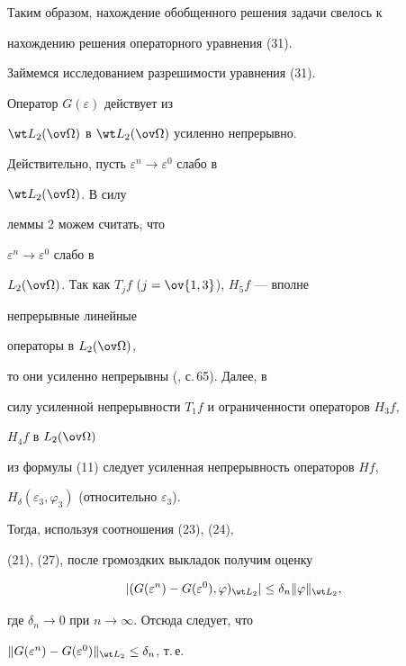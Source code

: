 Таким образом, нахождение обобщенного решения задачи свелось к 


нахождению решения операторного уравнения (31). 





Займемся исследованием разрешимости уравнения (31).


 


\begin{thm} 


Оператор $G(\varepsilon)$ действует из 


$\wt L_2(\ov\Omega)$ в $\wt L_2(\ov\Omega)$ усиленно непрерывно. 


\end{thm} 


 


Действительно, пусть $\varepsilon^n\to\varepsilon^0$ слабо в 


$\wt L_2(\ov\Omega)$. В силу 


леммы 2 можем считать, что 


$\varepsilon^n\to\varepsilon^0$ слабо в 


$L_2(\ov\Omega)$. Так как $T_jf$ ($j=\ov{1,3}$), $H_5f$ --- вполне 


непрерывные линейные 


операторы в $L_2(\ov\Omega)$, 


то они усиленно непрерывны (\cite{1}, с.\,65). Далее, в 


силу усиленной непрерывности $T_1f$ и ограниченности операторов $H_3f$, 


$H_4f$ в $L_2(\ov\Omega)$ 


из формулы (11) следует усиленная непрерывность операторов $Hf$, 


$H_\delta(\varepsilon_3,\varphi_3)$ (относительно $\varepsilon_3$). 


Тогда, используя соотношения (23), (24), 


(21), (27), после громоздких выкладок получим оценку 


$$ 


|(G(\varepsilon^n)-G(\varepsilon^0),\varphi)_{\wt L_2}| 


\le \delta_n\|\varphi\|_{\wt L_2}, 


$$ 


где $\delta_n\to 0$ при $n\to\infty$. Отсюда следует, что 


$\|G(\varepsilon^n)-G(\varepsilon^0)\|_{\wt L_2}\le\delta_n$, т.\,е. 


